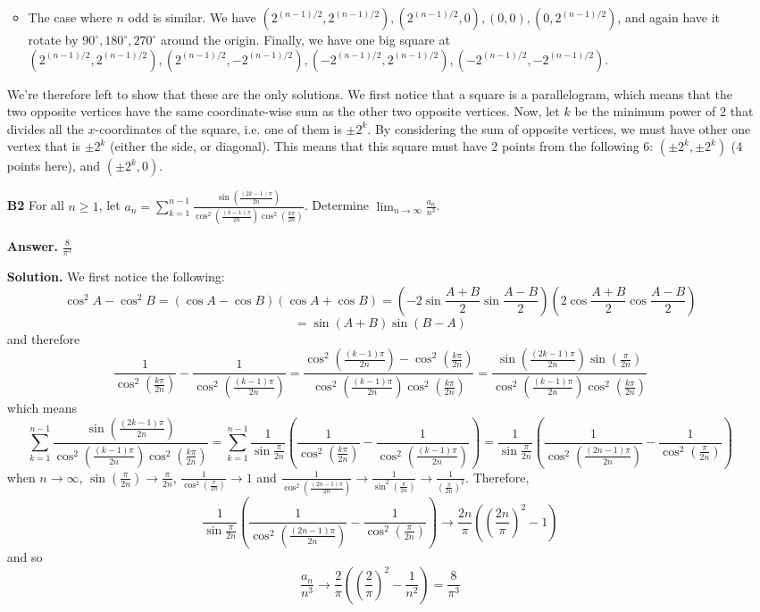 \documentclass[11pt,a4paper]{article}
\newcommand{\<}{\langle}
\renewcommand{\>}{\rangle}
\begin{document}
\begin{enumerate}
\begin{itemize}
		\item The case where $n$ odd is similar. We have $(2^{(n-1)/2}, 2^{(n-1)/2}), (2^{(n-1)/2}, 0), (0, 0), (0, 2^{(n-1)/2})$, and again have it rotate by $90^{\circ}, 180^{\circ}, 270^{\circ}$ around the origin. Finally, we have one big square at $(2^{(n-1)/2}, 2^{(n-1)/2}), (2^{(n-1)/2}, -2^{(n-1)/2}), (-2^{(n-1)/2}, 2^{(n-1)/2}), (-2^{(n-1)/2}, -2^{(n-1)/2})$. 
	\end{itemize}
	We're therefore left to show that these are the only solutions. We first notice that a square is a parallelogram, which means that the two opposite vertices have the same coordinate-wise sum as the other two opposite vertices. Now, let $k$ be the minimum power of 2 that divides all the $x$-coordinates of the square, i.e. one of them is $\pm 2^k$. By considering the sum of opposite vertices, we must have other one vertex that is $\pm 2^k$ (either the side, or diagonal). This means that this square must have 2 points from the following 6: $(\pm 2^k, \pm 2^k)$ (4 points here), and $(\pm 2^k, 0)$. 
	
	
	
	\item [\textbf{B2}] For all $n\ge 1$, let $a_n=\sum_{k=1}^{n-1}\frac{\sin(\frac{(2k-1)\pi}{2n})}{\cos^2(\frac{(k-1)\pi}{2n})\cos^2(\frac{k\pi}{2n})}$. Determine $\lim_{n\rightarrow \infty}\frac{a_n}{n^3}$.
	
	\textbf{Answer.} $\frac{8}{\pi^3}$
	
	\textbf{Solution.} We first notice the following: 
	\[
	\cos^2 A - \cos^2B = (\cos A-\cos B)(\cos A+\cos B)=(-2\sin\frac{A+B}{2}\sin\frac{A-B}{2})(2\cos\frac{A+B}{2}\cos\frac{A-B}{2})
	\]
	\[
	=\sin(A+B)\sin(B-A)
	\]
	and therefore 
	\[
	\frac{1}{\cos^2(\frac{k\pi}{2n})}-\frac{1}{\cos^2(\frac{(k-1)\pi}{2n})}
	=\frac{\cos^2(\frac{(k-1)\pi}{2n})-\cos^2(\frac{k\pi}{2n})}{\cos^2(\frac{(k-1)\pi}{2n})\cos^2(\frac{k\pi}{2n})}
	=\frac{\sin(\frac{(2k-1)\pi}{2n})\sin(\frac{\pi}{2n})}{\cos^2(\frac{(k-1)\pi}{2n})\cos^2(\frac{k\pi}{2n})}
	\]
	which means 
	\[
	\sum_{k=1}^{n-1}\frac{\sin(\frac{(2k-1)\pi}{2n})}{\cos^2(\frac{(k-1)\pi}{2n})\cos^2(\frac{k\pi}{2n})}
	=\sum_{k=1}^{n-1}\frac{1}{\sin\frac{\pi}{2n}}(\frac{1}{\cos^2(\frac{k\pi}{2n})}-\frac{1}{\cos^2(\frac{(k-1)\pi}{2n})})
	=\frac{1}{\sin\frac{\pi}{2n}}(\frac{1}{\cos^2(\frac{(2n-1)\pi}{2n})} - \frac{1}{\cos^2(\frac{\pi}{2n})})
	\]
	when $n\to\infty$, $\sin(\frac{\pi}{2n})\to \frac{\pi}{2n}$, $\frac{1}{\cos^2(\frac{\pi}{2n})}\to 1$ and $\frac{1}{\cos^2(\frac{(2n-1)\pi}{2n})}\to \frac{1}{\sin^2(\frac{\pi}{2n})}\to\frac{1}{(\frac{\pi}{2n})^2}$. Therefore, 
	\[
	\frac{1}{\sin\frac{\pi}{2n}}(\frac{1}{\cos^2(\frac{(2n-1)\pi}{2n})} - \frac{1}{\cos^2(\frac{\pi}{2n})})
	\to \frac{2n}{\pi}((\frac{2n}{\pi})^2-1)
	\]
	and so 
	\[
	\frac{a_n}{n^3}\to \frac{2}{\pi}((\frac{2}{\pi})^2-\frac{1}{n^2})=\frac{8}{\pi^3}
	\]
	

\end{enumerate}
\end{document}
